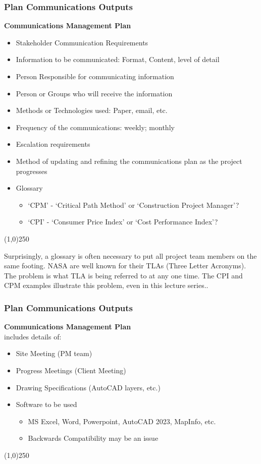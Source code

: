 \begin{frame}
\frametitle{Plan Communications \hfill\hfill Outputs}
\textbf{Communications Management Plan}
\begin{itemize}
	\item Stakeholder Communication Requirements
	\item Information to be communicated: Format, Content, level of detail
	\item Person Responsible for communicating information
	\item Person or Groups who will receive the information
	\item Methods or Technologies used: Paper, email, etc.
	\item Frequency of the communications: weekly; monthly
	\item Escalation requirements
	\item Method of updating and refining the communications plan as the project progresses
	\item Glossary 
	\begin{itemize}
		\item `CPM' - `Critical Path Method' or `Construction Project Manager'?
		\item `CPI' - `Consumer Price Index' or `Cost Performance Index'?
	\end{itemize}
\end{itemize}
\end{frame}\begin{center}\line(1,0){250}\end{center}

Surprisingly, a glossary is often necessary to put all project team members on the same footing.  NASA are well known for their TLAs (Three Letter Acronyms).  The problem is what TLA is being referred to at any one time.  The CPI and CPM examples illustrate this problem, even in this lecture series..


\begin{frame}
\frametitle{Plan Communications \hfill\hfill Outputs}
\textbf{Communications Management Plan}\\
includes details of: 
\begin{itemize}
	\item Site Meeting (PM team)
	\item Progress Meetings (Client Meeting)
	\item Drawing Specifications (AutoCAD layers, etc.)
	\item Software to be used
		\begin{itemize}
			\item MS Excel, Word, Powerpoint, AutoCAD 2023, MapInfo, etc.
			\item Backwards Compatibility may be an issue 
		\end{itemize}
\end{itemize}
\end{frame}\begin{center}\line(1,0){250}\end{center}




